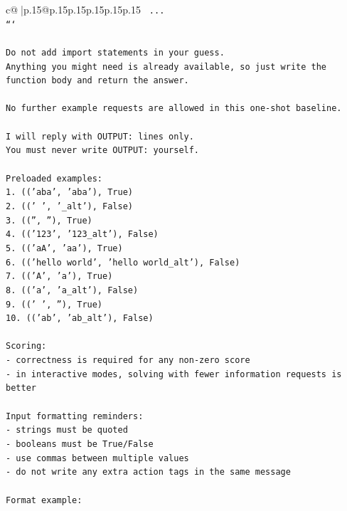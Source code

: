 \documentclass{article}
\begin{document}
{\begin{supertabular}{c@{$\;$}|p{.15\linewidth}@{}p{.15\linewidth}p{.15\linewidth}p{.15\linewidth}p{.15\linewidth}p{.15\linewidth}}
{{{\texttt{    ...} \\
\texttt{```} \\
\\ 
\texttt{Do not add import statements in your guess.} \\
\texttt{Anything you might need is already available, so just write the function body and return the answer.} \\
\\ 
\texttt{No further example requests are allowed in this one{-}shot baseline.} \\
\\ 
\texttt{I will reply with OUTPUT: lines only.} \\
\texttt{You must never write OUTPUT: yourself.} \\
\\ 
\texttt{Preloaded examples:} \\
\texttt{1. (('aba', 'aba'), True)} \\
\texttt{2. ((' ', '\_alt'), False)} \\
\texttt{3. (('', ''), True)} \\
\texttt{4. (('123', '123\_alt'), False)} \\
\texttt{5. (('aA', 'aa'), True)} \\
\texttt{6. (('hello world', 'hello world\_alt'), False)} \\
\texttt{7. (('A', 'a'), True)} \\
\texttt{8. (('a', 'a\_alt'), False)} \\
\texttt{9. (('   ', ''), True)} \\
\texttt{10. (('ab', 'ab\_alt'), False)} \\
\\ 
\texttt{Scoring:} \\
\texttt{{-} correctness is required for any non{-}zero score} \\
\texttt{{-} in interactive modes, solving with fewer information requests is better} \\
\\ 
\texttt{Input formatting reminders:} \\
\texttt{{-} strings must be quoted} \\
\texttt{{-} booleans must be True/False} \\
\texttt{{-} use commas between multiple values} \\
\texttt{{-} do not write any extra action tags in the same message} \\
\\ 
\texttt{Format example:} \\
}}}
\end{supertabular}}
\end{document}
